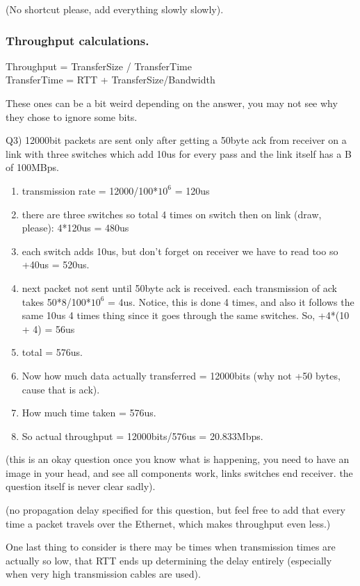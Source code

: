 \documentclass[11pt, a4paper]{article}
\begin{document}
(No shortcut please, add everything slowly slowly).

\subsubsection{Throughput calculations.}

Throughput = TransferSize / TransferTime \\
TransferTime = RTT + TransferSize/Bandwidth\par

These ones can be a bit weird depending on the answer, you may not see why they chose to ignore some bits.\par
Q3) 12000bit packets are sent only after getting a 50byte ack from receiver on a link with three switches which add 10us for every pass and the link itself has a B of 100MBps.
\begin{enumerate}
    \item transmission rate = 12000/100*$10^{6}$ = 120us
    \item there are three switches so total 4 times on switch then on link (draw, please): 4*120us = 480us
    \item each switch adds 10us, but don't forget on receiver we have to read too so +40us = 520us.
    \item next packet not sent until 50byte ack is received. each transmission of ack takes 50*8/100*$10^{6}$ = 4us. Notice, this is done 4 times, and also it follows the same 10us 4 times thing since it goes through the same switches. So, +4*(10 + 4) = 56us
    \item total = 576us.
    \item Now how much data actually transferred = 12000bits (why not +50 bytes, cause that is ack).
    \item How much time taken = 576us.
    \item So actual throughput = 12000bits/576us = 20.833Mbps.
\end{enumerate}
(this is an okay question once you know what is happening, you need to have an image in your head, and see all components work, links switches end receiver. the question itself is never clear sadly).\par
(no propagation delay specified for this question, but feel free to add that every time a packet travels over the Ethernet, which makes throughput even less.)\parskip\parskip

One last thing to consider is there may be times when transmission times are actually so low, that RTT ends up determining the delay entirely (especially when very high transmission cables are used).
\end{document}
